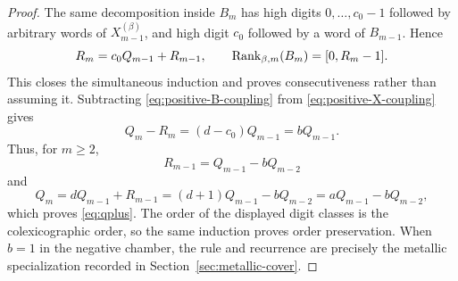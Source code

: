 \begin{proof}
The same decomposition inside $B_m$ has high digits
$0,\ldots,c_0-1$ followed by arbitrary words of $X_{m-1}^{(\beta)}$, and
high digit $c_0$ followed by a word of $B_{m-1}$.  Hence
\begin{equation}
R_m=c_0Q_{m-1}+R_{m-1},
\qquad
\operatorname{Rank}_{\beta,m}(B_m)=[0,R_m-1].
\label{eq:positive-B-coupling}
\end{equation}
This closes the simultaneous induction and proves consecutiveness rather than
assuming it.  Subtracting \eqref{eq:positive-B-coupling} from
\eqref{eq:positive-X-coupling} gives
\[
Q_m-R_m=(d-c_0)Q_{m-1}=bQ_{m-1}.
\]
Thus, for $m\ge2$,
\[
R_{m-1}=Q_{m-1}-bQ_{m-2}
\]
and
\[
Q_m=dQ_{m-1}+R_{m-1}
=(d+1)Q_{m-1}-bQ_{m-2}
=aQ_{m-1}-bQ_{m-2},
\]
which proves \eqref{eq:qplus}.  The order of the displayed digit classes is
the colexicographic order, so the same induction proves order preservation.
When $b=1$ in the negative chamber, the rule and recurrence are precisely
the metallic specialization recorded in Section~\ref{sec:metallic-cover}.
\end{proof}




